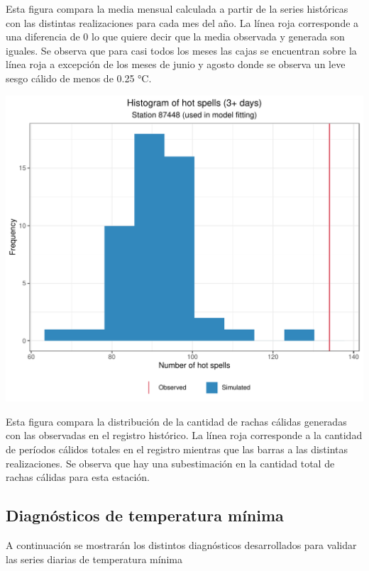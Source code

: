 \documentclass[
]{article}
\begin{document}
Esta figura compara la media mensual calculada a partir de la series históricas con las distintas realizaciones para cada mes del año. La línea roja corresponde a una diferencia de 0 lo que quiere decir que la media observada y generada son iguales. Se observa que para casi todos los meses las cajas se encuentran sobre la línea roja a excepción de los meses de junio y agosto donde se observa un leve sesgo cálido de menos de 0.25 °C.

\begin{center}\includegraphics{Webinario_Generador_files/figure-latex/unnamed-chunk-46-1} \end{center}

Esta figura compara la distribución de la cantidad de rachas cálidas generadas con las observadas en el registro histórico. La línea roja corresponde a la cantidad de períodos cálidos totales en el registro mientras que las barras a las distintas realizaciones. Se observa que hay una subestimación en la cantidad total de rachas cálidas para esta estación.

\hypertarget{diagnuxf3sticos-de-temperatura-muxednima}{%
\subsection{Diagnósticos de temperatura mínima}\label{diagnuxf3sticos-de-temperatura-muxednima}}

A continuación se mostrarán los distintos diagnósticos desarrollados para validar las series diarias de temperatura mínima
\end{document}
